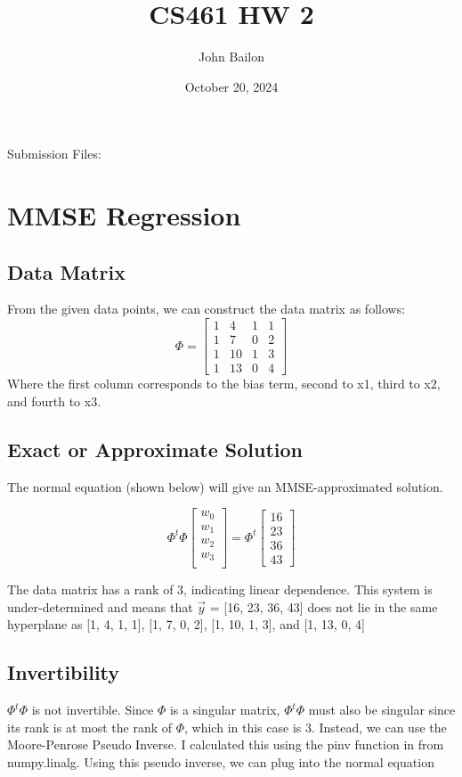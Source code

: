\documentclass{article}
\title{CS461 HW 2}
\author{John Bailon}
\date{October 20, 2024}
\begin{document}
\maketitle

\noindent
Submission Files:

\section{MMSE Regression}
\subsection{Data Matrix}
From the given data points, we can construct the data matrix as follows:
\[
\Phi = \begin{bmatrix}
1 & 4 & 1 & 1\\
1 & 7 & 0 & 2\\
1 & 10 & 1 & 3\\
1 & 13 & 0 & 4
\end{bmatrix}
\]
\noindent
Where the first column corresponds to the bias term, second to x1, third to x2, and fourth to x3.

\subsection{Exact or Approximate Solution}

The normal equation (shown below) will give an MMSE-approximated solution.

\[
\Phi^t \Phi \begin{bmatrix}
w_0\\
w_1\\
w_2\\
w_3\\
\end{bmatrix} = \Phi^t \begin{bmatrix}
16\\
23\\
36\\
43
\end{bmatrix} 
\]

\noindent
The data matrix has a rank of 3, indicating linear dependence. This system is under-determined and means that $\Vec{y}$ = [16, 23, 36, 43] does not lie in the same hyperplane as [1, 4, 1, 1], [1, 7, 0, 2], [1, 10, 1, 3], and [1, 13, 0, 4]

\subsection{Invertibility}
$\Phi^t \Phi$ is not invertible. Since $\Phi$ is a singular matrix, $\Phi^t \Phi$ must also be singular since its rank is at most the rank of $\Phi$, which in this case is 3. Instead, we can use the Moore-Penrose Pseudo Inverse. I calculated this using the pinv function in from numpy.linalg. Using this pseudo inverse, we can plug into the normal equation
\end{document}
